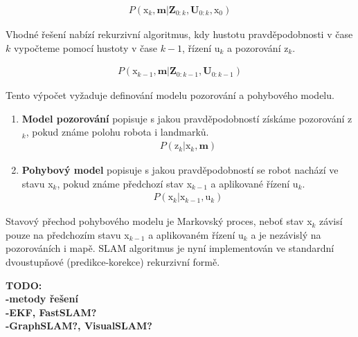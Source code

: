 \documentclass[12pt,a4paper]{article}
\begin{document}
\begin{eqnarray}
P(\text{x}_k, \textbf{m} | \textbf{Z}_{0:k}, \textbf{U}_{0:k}, \text{x}_0)
\end{eqnarray}

Vhodné řešení nabízí rekurzivní algoritmus, kdy hustotu pravděpodobnosti v čase $k$ vypočteme pomocí hustoty v čase $k-1$, řízení u$_k$ a pozorování z$_k$.

\begin{eqnarray}
P(\text{x}_{k-1}, \textbf{m} | \textbf{Z}_{0:k-1}, \textbf{U}_{0:k-1})
\end{eqnarray}

Tento výpočet vyžaduje definování modelu pozorování a pohybového modelu.

\begin{enumerate}
\item \textbf{Model pozorování} popisuje s jakou pravděpodobností získáme pozorování z$_k$, pokud známe polohu robota i landmarků.
\begin{eqnarray}
P(\text{z}_k | \text{x}_k, \textbf{m})
\end{eqnarray}
\item \textbf{Pohybový model} popisuje s jakou pravděpodobností se robot nachází ve stavu x$_k$, pokud známe předchozí stav x$_{k-1}$ a aplikované řízení u$_k$.
\begin{eqnarray}
P(\text{x}_k | \text{x}_{k-1}, \text{u}_k)
\end{eqnarray}
\end{enumerate}

Stavový přechod pohybového modelu je Markovský proces, neboť stav x$_k$ závisí pouze na předchozím stavu x$_{k-1}$ a aplikovaném řízení u$_k$ a je nezávislý na pozorováních i mapě. SLAM algoritmus je nyní implementován ve standardní dvoustupňové (predikce-korekce) rekurzivní formě.

\newpage


\textbf{TODO: \\
-metody řešení \\
-EKF, FastSLAM? \\
-GraphSLAM?, VisualSLAM?} 
\end{document}
